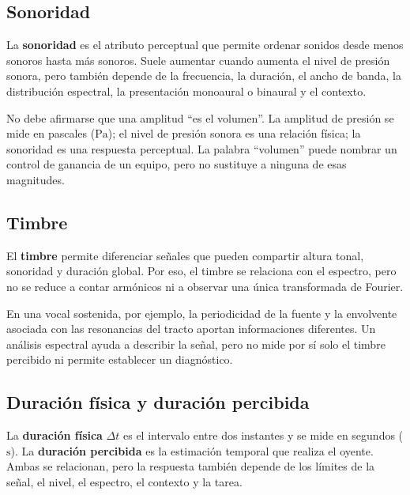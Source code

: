 \subsection{Sonoridad}
\label{sec:u7-sonoridad}

La \textbf{sonoridad} es el atributo perceptual que permite ordenar sonidos
desde menos sonoros hasta más sonoros. Suele aumentar cuando aumenta el nivel
de presión sonora, pero también depende de la frecuencia, la duración, el
ancho de banda, la distribución espectral, la presentación monoaural o
binaural y el contexto.

No debe afirmarse que una amplitud ``es el volumen''. La amplitud de presión
se mide en pascales (\(\text{Pa}\)); el nivel de presión sonora es una relación
física; la sonoridad es una respuesta perceptual. La palabra ``volumen'' puede
nombrar un control de ganancia de un equipo, pero no sustituye a ninguna de
esas magnitudes.

\subsection{Timbre}
\label{sec:u7-timbre}

El \textbf{timbre} permite diferenciar señales que pueden compartir altura
tonal, sonoridad y duración global.  Por eso, el timbre se
relaciona con el espectro, pero no se reduce a contar armónicos ni a observar
una única transformada de Fourier.

En una vocal sostenida, por ejemplo, la periodicidad de la fuente y la
envolvente asociada con las resonancias del tracto aportan informaciones
diferentes. Un análisis espectral ayuda a describir la señal, pero no mide por
sí solo el timbre percibido ni permite establecer un diagnóstico.

\subsection{Duración física y duración percibida}
\label{sec:u7-duracion}

La \textbf{duración física} \(\Delta t\) es el intervalo entre dos instantes y
se mide en segundos (\(\text{s}\)). La \textbf{duración percibida} es la
estimación temporal que realiza el oyente. Ambas se relacionan, pero la
respuesta también depende de los límites de la señal, el nivel, el espectro,
el contexto y la tarea.

